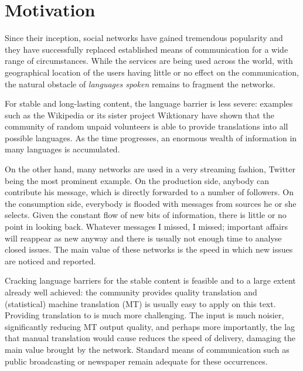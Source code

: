 \documentclass[11pt]{article}
\begin{document}
%

\section{Motivation}
\label{motiv}

Since their inception, social networks have gained tremendous popularity and
they have successfully replaced established means of communication for a wide
range of circumstances. While the services are being used across the world, with
geographical location of the users having little or no effect on the
communication, the
natural obstacle of \emph{languages spoken} remains to fragment the networks.

For stable and long-lasting content, the language barrier is less severe:
examples such as the Wikipedia or its sister project Wiktionary have shown that
the community of random unpaid volunteers is able to provide translations into
all possible languages. As the time progresses, an enormous wealth of
information in many languages is accumulated.

On the other hand, many networks are used in a very streaming fashion, Twitter
being the most prominent example. On the production side, anybody can contribute
his message, which is
directly forwarded to a number of followers. On the consumption side, everybody
is flooded with messages from sources he or she selects. Given the constant flow
of new bits of information, there is little or no point in looking back.
Whatever messages I missed, I missed; important affairs will reappear as new
anyway and there is usually not enough time to analyse closed issues. The main
value of these networks is the speed in which new issues are noticed and
reported.

Cracking language barriers for the stable content is feasible and to a large
extent already well achieved: the community provides quality translation and
(statistical) machine translation (MT) is usually easy to apply on this
 text.
Providing translation to  is much more challenging.
The input is much noisier, significantly reducing MT output quality, and perhaps
more importantly, the lag that manual translation would cause reduces the speed
of delivery, damaging the main value brought by the network. Standard means of
communication such as public broadcasting or newspaper remain adequate for these
occurrences.
\end{document}
